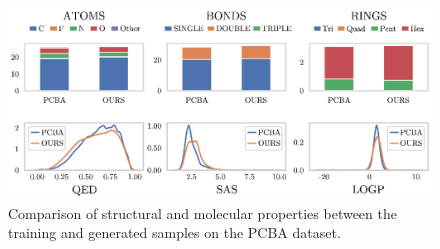 \begin{figure}[h!]
    \centering
    \includegraphics[width=.95\textwidth]{Figures/Chapter7/props-pcba.eps}
    \caption{Comparison of structural and molecular properties between the training and generated samples on the PCBA dataset.}
    \label{fig:pcba-props}
\end{figure}
